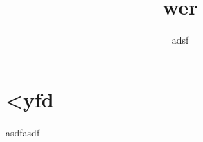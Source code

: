 \documentclass[a4paper,10pt]{article}
\title{wer}
\author{adsf}
\begin{document}
\maketitle

\begin{abstract}

\end{abstract}

\section{<yfd}
asdfasdf
\end{document}
